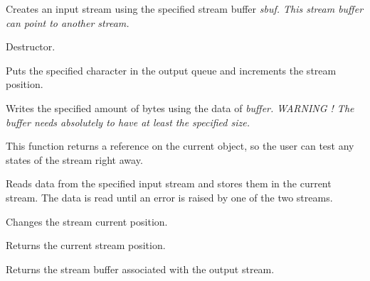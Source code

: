 Creates an input stream using the specified stream buffer \it{sbuf}. This
stream buffer can point to another stream.


Destructor.



Puts the specified character in the output queue and increments the
stream position.


Writes the specified amount of bytes using the data of \it{buffer}.
\it{WARNING !} The buffer needs absolutely to have at least the specified size.

This function returns a reference on the current object, so the user can test
any states of the stream right away.


Reads data from the specified input stream and stores them 
in the current stream. The data is read until an error is raised
by one of the two streams.



Changes the stream current position.


Returns the current stream position.



Returns the stream buffer associated with the output stream.




